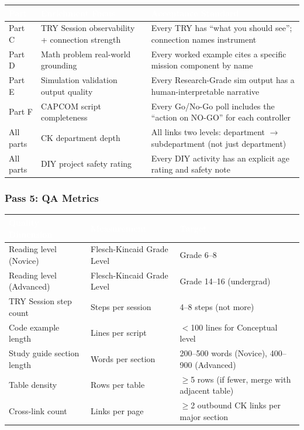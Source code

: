 \documentclass[11pt,letterpaper]{article}
\newcommand{\tableheader}[1]{\textbf{\sffamily\textcolor{white}{#1}}}
\begin{document}
\begin{center}
\begin{tabularx}{\textwidth}{L{1.5cm}L{5cm}X}
\toprule
{}
\tableheader{Part} & \tableheader{Enrichment Focus} & \tableheader{Acceptance Standard} \\
\midrule
Part C & TRY Session observability + connection strength & Every TRY has ``what you should see''; connection names instrument \\
Part D & Math problem real-world grounding & Every worked example cites a specific mission component by name \\
Part E & Simulation validation output quality & Every Research-Grade sim output has a human-interpretable narrative \\
Part F & CAPCOM script completeness & Every Go/No-Go poll includes the ``action on NO-GO'' for each controller \\
All parts & CK department depth & All links two levels: department $\to$ subdepartment (not just department) \\
All parts & DIY project safety rating & Every DIY activity has an explicit age rating and safety note \\
\bottomrule
\end{tabularx}
\end{center}

\subsubsection{Pass 5: QA Metrics}

\begin{center}
\begin{tabularx}{\textwidth}{L{3cm}L{3cm}X}
\toprule
{}
\tableheader{Quality Dimension} & \tableheader{Measurement} & \tableheader{Target} \\
\midrule
Reading level (Novice) & Flesch-Kincaid Grade Level & Grade 6--8 \\
Reading level (Advanced) & Flesch-Kincaid Grade Level & Grade 14--16 (undergrad) \\
TRY Session step count & Steps per session & 4--8 steps (not more) \\
Code example length & Lines per script & $<$100 lines for Conceptual level \\
Study guide section length & Words per section & 200--500 words (Novice), 400--900 (Advanced) \\
Table density & Rows per table & $\geq$5 rows (if fewer, merge with adjacent table) \\
Cross-link count & Links per page & $\geq$2 outbound CK links per major section \\
\bottomrule
\end{tabularx}
\end{center}
\end{document}
